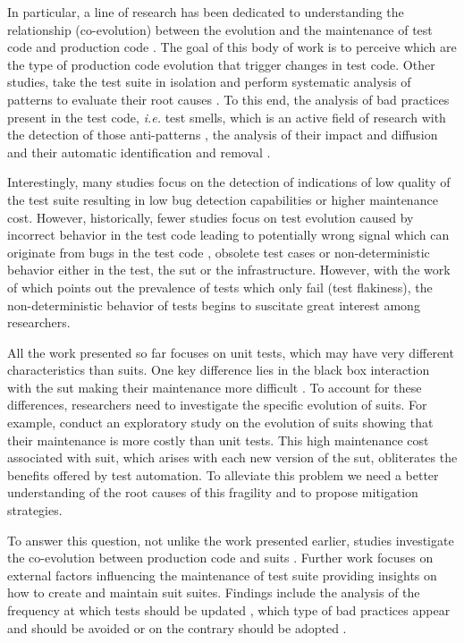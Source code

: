 In particular, a line of research has been dedicated to understanding the relationship (co-evolution) between the evolution and the maintenance of test code and production code \cite{Lamkanfi2010, Zaidman2011, Marsavina2014, Levin2017, Vidacs2018, Alenezi2019}. The goal of this body of work is to perceive which are the type of production code evolution that trigger changes in test code. Other studies, take the test suite in isolation and perform systematic analysis of patterns to evaluate their root causes \cite{Pinto2012}. To this end, the analysis of bad practices present in the test code, \emph{i.e.} test smells, which is an active field of research with the detection of those anti-patterns \cite{VanDeursen2001, Bowes2017, Tufano2016}, the analysis of their impact and diffusion \cite{Bavota2015, Tufano2016, Kim2020} and their automatic identification and removal \cite{VanRompaey2007, Reichhart2007, Peruma2020}.

Interestingly, many studies focus on the detection of indications of low quality of the test suite resulting in low bug detection capabilities or higher maintenance cost. However, historically, fewer studies focus on test evolution caused by incorrect behavior in the test code leading to potentially wrong signal which can originate from bugs in the test code \cite{Vahabzadeh2015}, obsolete test cases \cite{Hao2013, Tang2015} or non-deterministic behavior either in the test, the \gls{sut} or the infrastructure. However, with the work of \textcite{Luo2014} which points out the prevalence of tests which only fail (test flakiness), the non-deterministic behavior of tests begins to suscitate great interest among researchers.

All the work presented so far focuses on unit tests, which may have very different characteristics than \gls{suit}s. One key difference lies in the black box interaction with the \gls{sut} making their maintenance more difficult \cite{Berner2005}. To account for these differences, researchers need to investigate the specific evolution of \gls{suit}s. For example, \textcite{Skoglund2004} conduct an exploratory study on the evolution of \gls{suit}s showing that their maintenance is more costly than unit tests. This high maintenance cost associated with \gls{suit}, which arises with each new version of the \gls{sut}, obliterates the benefits offered by test automation. To alleviate this problem we need a better understanding of the root causes of this fragility and to propose mitigation strategies.

To answer this question, not unlike the work presented earlier, studies investigate the co-evolution between production code and \gls{suit}s \cite{Shewchuk2010, Christophe2014}. Further work focuses on external factors influencing the maintenance of test suite \cite{Alegroth2013, Kan2013, Alegroth2016, Lavoie2017} providing insights on how to create and maintain \gls{suit} suites. Findings include the analysis of the frequency at which tests should be updated \cite{Alegroth2013, Alegroth2016}, which type of bad practices appear and should be avoided \cite{Chen2012, Lavoie2017} or on the contrary should be adopted \cite{Kan2013}.

